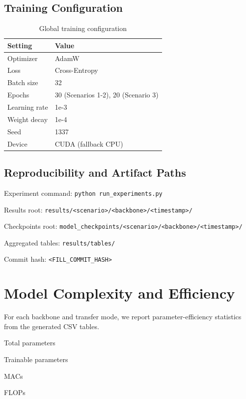 \documentclass[11pt,a4paper]{report}
\renewenvironment{leftbar}[1][\hsize]
  {\def\FrameCommand{{\color{subsectionblue}\vrule width 3pt}\hspace{0pt}}%
   \MakeFramed{\hsize#1\advance\hsize-\width\FrameRestore}}
  {\endMakeFramed}
\renewenvironment{itemize}{\begin{leftbar}\begin{originalitemize}}{\end{originalitemize}\end{leftbar}}
\begin{document}
\section{Training Configuration}
\begin{table}[H]
\centering
\caption{Global training configuration}
\label{tab:global-config}
\begin{tabular}{ll}
\toprule
\rowcolor{tableheader}
\textbf{Setting} & \textbf{Value} \\
\midrule
Optimizer & AdamW \\
Loss & Cross-Entropy \\
Batch size & 32 \\
Epochs & 30 (Scenarios 1-2), 20 (Scenario 3) \\
Learning rate & 1e-3 \\
Weight decay & 1e-4 \\
Seed & 1337 \\
Device & CUDA (fallback CPU) \\
\bottomrule
\end{tabular}
\end{table}

\section{Reproducibility and Artifact Paths}
\begin{itemize}
  \item Experiment command: \texttt{python run\_experiments.py}
  \item Results root: \texttt{results/<scenario>/<backbone>/<timestamp>/}
  \item Checkpoints root: \texttt{model\_checkpoints/<scenario>/<backbone>/<timestamp>/}
  \item Aggregated tables: \texttt{results/tables/}
  \item Commit hash: \texttt{<FILL\_COMMIT\_HASH>}
\end{itemize}

\chapter{Model Complexity and Efficiency}

For each backbone and transfer mode, we report parameter-efficiency statistics from the generated CSV tables.
\begin{itemize}
  \item Total parameters
  \item Trainable parameters
  \item MACs
  \item FLOPs
\end{itemize}
\end{document}
